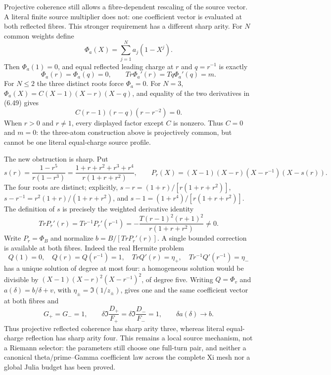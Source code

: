 \documentclass[11pt]{article}
\theoremstyle{definition}
\theoremstyle{remark}
\begin{document}
Projective coherence still allows a fibre-dependent rescaling of the source vector.  A literal
finite source multiplier does not: one coefficient vector is evaluated at both reflected
fibres.  This stronger requirement has a different sharp arity.  For $N$ common weights define
\[
 \Phi_a(X)=\sum_{j=1}^N a_j(1-X^j).                   \tag{6.48}
\]
Then $\Phi_a(1)=0$, and equal reflected leading charge at $r$ and $q=r^{-1}$ is exactly
\[
 \Phi_a(r)=\Phi_a(q)=0,\qquad
 Tr\Phi_a'(r)=Tq\Phi_a'(q)=m.                         \tag{6.49}
\]
For $N\leq2$ the three distinct roots force $\Phi_a=0$.  For $N=3$,
$\Phi_a(X)=C(X-1)(X-r)(X-q)$, and equality of the two derivatives in (6.49) gives
\[
 C(r-1)(r-q)(r-r^{-2})=0.                             \tag{6.50}
\]
When $r>0$ and $r\ne1$, every displayed factor except $C$ is nonzero.  Thus $C=0$ and
$m=0$: the three-atom construction above is projectively common, but cannot be one literal
equal-charge source profile.

The new obstruction is sharp.  Put
\[
 s(r)=\frac{1-r^5}{r(1-r^3)}
     =\frac{1+r+r^2+r^3+r^4}{r(1+r+r^2)},\qquad
 P_r(X)=(X-1)(X-r)(X-r^{-1})(X-s(r)).                 \tag{6.51}
\]
The four roots are distinct; explicitly,
$s-r=(1+r)/[r(1+r+r^2)]$,
$s-r^{-1}=r^2(1+r)/(1+r+r^2)$, and
$s-1=(1+r^4)/[r(1+r+r^2)]$.  The definition of $s$ is precisely the weighted derivative
identity
\[
 TrP_r'(r)=Tr^{-1}P_r'(r^{-1})
 =-\frac{T(r-1)^2(r+1)^2}{r(1+r+r^2)}\ne0.            \tag{6.52}
\]
Write $P_r=\Phi_B$ and normalize $b=B/[TrP_r'(r)]$.  A single bounded correction is available
at both fibres.  Indeed the real Hermite problem
\[
 Q(1)=0,\quad Q(r)=Q(r^{-1})=1,\quad
 TrQ'(r)=\eta_+,\quad Tr^{-1}Q'(r^{-1})=\eta_-        \tag{6.53}
\]
has a unique solution of degree at most four: a homogeneous solution would be divisible by
$(X-1)(X-r)^2(X-r^{-1})^2$, of degree five.  Writing $Q=\Phi_v$ and
$a(\delta)=b/\delta+v$, with
$\eta_\pm=\Im(1/z_\pm)$, gives one and the same coefficient vector at both fibres and
\[
 G_+=G_-=1,\qquad
 \delta\Im\frac{D_+}{F_+}
 =\delta\Im\frac{D_-}{F_-}=1,\qquad
 \delta a(\delta)\longrightarrow b.                  \tag{6.54}
\]
Thus projective reflected coherence has sharp arity three, whereas literal equal-charge
reflection has sharp arity four.  This remains a local source mechanism, not a Riemann selector:
the parameters still choose one full-turn pair, and neither a canonical theta/prime--Gamma
coefficient law across the complete Xi mesh nor a global Julia budget has been proved.
\end{document}
